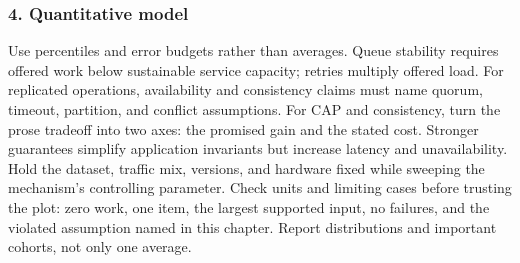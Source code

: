 \subsubsection*{4. Quantitative model}
Use percentiles and error budgets rather than averages. Queue stability requires offered work below sustainable service capacity; retries multiply offered load. For replicated operations, availability and consistency claims must name quorum, timeout, partition, and conflict assumptions.
For CAP and consistency, turn the prose tradeoff into two axes: the promised gain and the stated cost. Stronger guarantees simplify application invariants but increase latency and unavailability. Hold the dataset, traffic mix, versions, and hardware fixed while sweeping the mechanism's controlling parameter.
Check units and limiting cases before trusting the plot: zero work, one item, the largest supported input, no failures, and the violated assumption named in this chapter. Report distributions and important cohorts, not only one average.
